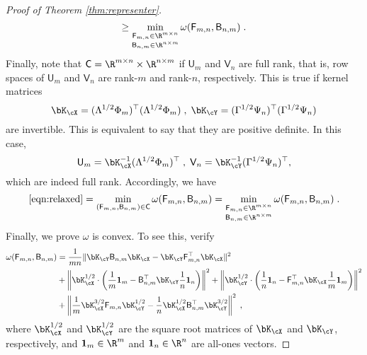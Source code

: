 \documentclass[11pt]{article}
\begin{document}
\begin{proof}[Proof of Theorem \ref{thm:representer}]
\begin{equation*}
		\ge
		\min_{\substack{\mathsf{F}_{m, n} \in \R^{m \times n} \\ \mathsf{B}_{n, m} \in \R^{n \times m}}} \omega(\mathsf{F}_{m, n}, \mathsf{B}_{n, m}) \;.
	\end{equation*}
	Finally, note that $\mathsf{C} = \R^{m \times n} \times \R^{n \times m}$ if $\mathsf{U}_m$ and $\mathsf{V}_n$ are full rank, that is, row spaces of $\mathsf{U}_m$ and $\mathsf{V}_n$ are rank-$m$ and rank-$n$, respectively. This is true if kernel matrices 
	\begin{equation*}
		\bK_{\cX} = (\Lambda^{1 / 2} \Phi_m)^\top (\Lambda^{1 / 2} \Phi_m) \;, \; \bK_{\cY} = (\Gamma^{1 / 2} \Psi_n)^\top (\Gamma^{1 / 2} \Psi_n)
	\end{equation*}
	are invertible. This is equivalent to say that they are positive definite. In this case, 
	\begin{equation*}
		\mathsf{U}_m = \bK_{\cX}^{- 1} (\Lambda^{1 / 2} \Phi_m)^\top \;, \;
		\mathsf{V}_n = \bK_{\cY}^{- 1} (\Gamma^{1 / 2} \Psi_n)^\top,
	\end{equation*}
	which are indeed full rank. Accordingly, we have 
	\begin{equation*}
		\eqref{eqn:relaxed}
		=
		\min_{(\mathsf{F}_{m, n}, \mathsf{B}_{n, m}) \in \mathsf{C}} \omega(\mathsf{F}_{m, n}, \mathsf{B}_{n, m})
		=
		\min_{\substack{\mathsf{F}_{m, n} \in \R^{m \times n} \\ \mathsf{B}_{n, m} \in \R^{n \times m}}} \omega(\mathsf{F}_{m, n}, \mathsf{B}_{n, m}) \;.
	\end{equation*}
	Finally, we prove $\omega$ is convex. To see this, verify
	\begin{align*}
		\omega(\mathsf{F}_{m, n}, \mathsf{B}_{n, m})
		& = \frac{1}{mn} \| \bK_{\cY} \mathsf{B}_{n, m} \bK_{\cX} - \bK_{\cY} \mathsf{F}_{m, n}^\top \bK_{\cX} \|^2 \\
		& + \left\|\bK_{\cX}^{1/2} \cdot \left(\frac{1}{m} \mathbf{1}_m - \mathsf{B}_{n, m}^\top \bK_{\cY} \frac{1}{n} \mathbf{1}_n \right) \right\|^2
		+ \left\|\bK_{\cY}^{1/2} \cdot \left(\frac{1}{n} \mathbf{1}_n - \mathsf{F}_{m, n}^\top \bK_{\cX} \frac{1}{m} \mathbf{1}_m \right) \right\|^2 \\
		& + \left\| \frac{1}{m} \bK_{\cX}^{3/2} \mathsf{F}_{m,n} \bK_{\cY}^{1/2} - \frac{1}{n} \bK_{\cX}^{1/2} \mathsf{B}_{n,m}^\top \bK_{\cY}^{3/2} \right\|^2 \;,
	\end{align*}
	where $\bK_{\cX}^{1 / 2}$ and $\bK_{\cY}^{1 / 2}$ are the square root matrices of $\bK_{\cX}$ and $\bK_{\cY}$, respectively, and $\mathbf{1}_m \in \R^m$ and $\mathbf{1}_n \in \R^n$ are all-ones vectors. 
\end{proof}
\end{document}
